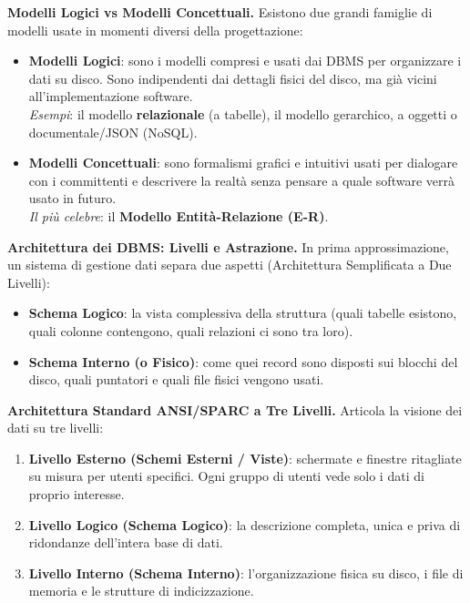 \documentclass[12pt]{extarticle}
\begin{document}
\medskip
\noindent \textbf{Modelli Logici vs Modelli Concettuali.} Esistono due grandi famiglie di modelli usate in momenti diversi della progettazione:
\begin{itemize}
    \item \textbf{Modelli Logici}: sono i modelli compresi e usati dai DBMS per organizzare i dati su disco. Sono indipendenti dai dettagli fisici del disco, ma già vicini all'implementazione software. \\
    \textit{Esempi}: il modello \textbf{relazionale} (a tabelle), il modello gerarchico, a oggetti o documentale/JSON (NoSQL).
    \item \textbf{Modelli Concettuali}: sono formalismi grafici e intuitivi usati per dialogare con i committenti e descrivere la realtà senza pensare a quale software verrà usato in futuro. \\
    \textit{Il più celebre}: il \textbf{Modello Entità-Relazione (E-R)}.
\end{itemize}

\medskip
\noindent \textbf{Architettura dei DBMS: Livelli e Astrazione.} In prima approssimazione, un sistema di gestione dati separa due aspetti (Architettura Semplificata a Due Livelli):
\begin{itemize}
    \item \textbf{Schema Logico}: la vista complessiva della struttura (quali tabelle esistono, quali colonne contengono, quali relazioni ci sono tra loro).
    \item \textbf{Schema Interno (o Fisico)}: come quei record sono disposti sui blocchi del disco, quali puntatori e quali file fisici vengono usati.
\end{itemize}

\medskip
\noindent \textbf{Architettura Standard ANSI/SPARC a Tre Livelli.} Articola la visione dei dati su tre livelli:
\begin{enumerate}
    \item \textbf{Livello Esterno (Schemi Esterni / Viste)}: schermate e finestre ritagliate su misura per utenti specifici. Ogni gruppo di utenti vede solo i dati di proprio interesse.
    \item \textbf{Livello Logico (Schema Logico)}: la descrizione completa, unica e priva di ridondanze dell'intera base di dati.
    \item \textbf{Livello Interno (Schema Interno)}: l'organizzazione fisica su disco, i file di memoria e le strutture di indicizzazione.
\end{enumerate}
\end{document}
